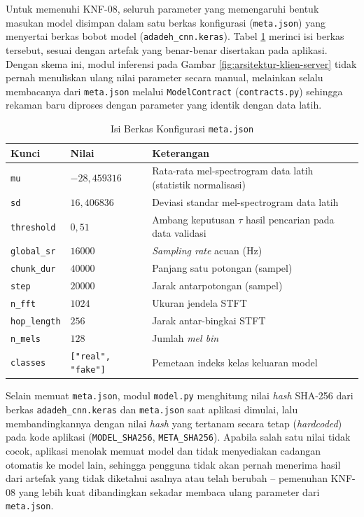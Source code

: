 Untuk memenuhi KNF-08, seluruh parameter yang memengaruhi bentuk masukan model
disimpan dalam satu berkas konfigurasi (\texttt{meta.json}) yang menyertai berkas
bobot model (\texttt{adadeh\_cnn.keras}). Tabel \ref{tab:meta-json} merinci isi
berkas tersebut, sesuai dengan artefak yang benar-benar disertakan pada aplikasi.
Dengan skema ini, modul inferensi pada Gambar \ref{fig:arsitektur-klien-server}
tidak pernah menuliskan ulang nilai parameter secara manual, melainkan selalu
membacanya dari \texttt{meta.json} melalui \texttt{ModelContract}
(\texttt{contracts.py}) sehingga rekaman baru diproses dengan parameter yang
identik dengan data latih.

\begin{table}[htbp]
  \centering
  \caption{Isi Berkas Konfigurasi \texttt{meta.json}}
  \label{tab:meta-json}
  \begin{tabular}{@{}llp{6.2cm}@{}}
    \toprule
    \textbf{Kunci} & \textbf{Nilai} & \textbf{Keterangan} \\
    \midrule
    \texttt{mu} & $-28{,}459316$ & Rata-rata mel-spectrogram data latih (statistik normalisasi) \\
    \texttt{sd} & $16{,}406836$ & Deviasi standar mel-spectrogram data latih \\
    \texttt{threshold} & $0{,}51$ & Ambang keputusan $\tau$ hasil pencarian pada data validasi \\
    \texttt{global\_sr} & $16000$ & \textit{Sampling rate} acuan (Hz) \\
    \texttt{chunk\_dur} & $40000$ & Panjang satu potongan (sampel) \\
    \texttt{step} & $20000$ & Jarak antarpotongan (sampel) \\
    \texttt{n\_fft} & $1024$ & Ukuran jendela STFT \\
    \texttt{hop\_length} & $256$ & Jarak antar-bingkai STFT \\
    \texttt{n\_mels} & $128$ & Jumlah \textit{mel bin} \\
    \texttt{classes} & \texttt{["real", "fake"]} & Pemetaan indeks kelas keluaran model \\
    \bottomrule
  \end{tabular}
\end{table}

Selain memuat \texttt{meta.json}, modul \texttt{model.py} menghitung nilai
\textit{hash} SHA-256 dari berkas \texttt{adadeh\_cnn.keras} dan \texttt{meta.json}
saat aplikasi dimulai, lalu membandingkannya dengan nilai \textit{hash} yang
tertanam secara tetap (\textit{hardcoded}) pada kode aplikasi
(\texttt{MODEL\_SHA256}, \texttt{META\_SHA256}). Apabila salah satu nilai tidak
cocok, aplikasi menolak memuat model dan tidak menyediakan cadangan otomatis ke
model lain, sehingga pengguna tidak akan pernah menerima hasil dari artefak yang
tidak diketahui asalnya atau telah berubah -- pemenuhan KNF-08 yang lebih kuat
dibandingkan sekadar membaca ulang parameter dari \texttt{meta.json}.

